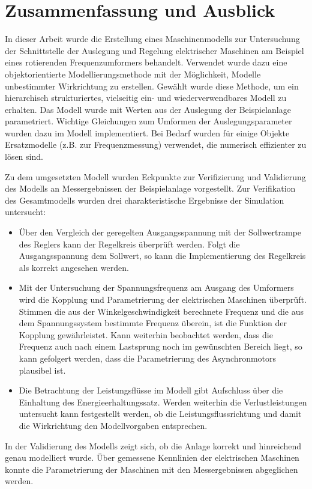 \chapter{Zusammenfassung und Ausblick}
\label{chap:ZusammenfassungAusblick}
In dieser Arbeit wurde die Erstellung eines Maschinenmodells zur Untersuchung der Schnittstelle der Auslegung und Regelung elektrischer Maschinen am Beispiel eines rotierenden Frequenzumformers behandelt. Verwendet wurde dazu eine objektorientierte Modellierungsmethode mit der Möglichkeit, Modelle unbestimmter Wirkrichtung zu erstellen. Gewählt wurde diese Methode, um ein hierarchisch strukturiertes, vielseitig ein- und wiederverwendbares Modell zu erhalten. Das Modell wurde mit Werten aus der Auslegung der Beispielanlage parametriert. Wichtige Gleichungen zum Umformen der Auslegungsparameter wurden dazu im Modell implementiert. Bei Bedarf wurden für einige Objekte Ersatzmodelle (z.B. zur Frequenzmessung) verwendet, die numerisch effizienter zu lösen sind.

Zu dem umgesetzten Modell wurden Eckpunkte zur Verifizierung und Validierung des Modells an Messergebnissen der Beispielanlage vorgestellt. Zur Verifikation des Gesamtmodells wurden drei charakteristische Ergebnisse der Simulation untersucht:
\begin{itemize}
	\item Über den Vergleich der geregelten Ausgangsspannung mit der Sollwertrampe des Reglers kann der Regelkreis überprüft werden. Folgt die Ausgangsspannung dem Sollwert, so kann die Implementierung des Regelkreis als korrekt angesehen werden.
	\item Mit der Untersuchung der Spannungsfrequenz am Ausgang des Umformers wird die Kopplung und Parametrierung der elektrischen Maschinen überprüft. Stimmen die aus der Winkelgeschwindigkeit berechnete Frequenz und die aus dem Spannungssystem bestimmte Frequenz überein, ist die Funktion der Kopplung gewährleistet. Kann weiterhin beobachtet werden, dass die Frequenz auch nach einem Lastsprung noch im gewünschten Bereich liegt, so kann gefolgert werden, dass die Parametrierung des Asynchronmotors plausibel ist.
	\item Die Betrachtung der Leistungsflüsse im Modell gibt Aufschluss über die Einhaltung des Energieerhaltungssatz. Werden weiterhin die Verlustleistungen untersucht kann festgestellt werden, ob die Leistungsflussrichtung und damit die Wirkrichtung den Modellvorgaben entsprechen.
\end{itemize}
In der Validierung des Modells zeigt sich, ob die Anlage korrekt und hinreichend genau modelliert wurde. Über gemessene Kennlinien der elektrischen Maschinen konnte die Parametrierung der Maschinen mit den Messergebnissen abgeglichen werden.

